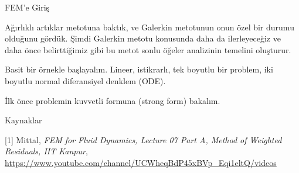 \documentclass[12pt,fleqn]{article}\usepackage{../../common}
\begin{document}
FEM'e Giriş

Ağırlıklı artıklar metotuna baktık, ve Galerkin metotunun onun özel bir durumu
olduğunu gördük. Şimdi Galerkin metotu konusunda daha da ilerleyeceğiz ve daha
önce belirttiğimiz gibi bu metot sonlu öğeler analizinin temelini oluşturur.

Basit bir örnekle başlayalım. Lineer, istikrarlı, tek boyutlu bir problem, iki
boyutlu normal diferansiyel denklem (ODE).

İlk önce problemin kuvvetli formuna (strong form) bakalım.



Kaynaklar

[1] Mittal, {\em FEM for Fluid Dynamics, Lecture 07 Part A, Method of Weighted Residuals, IIT Kanpur},
    \url{https://www.youtube.com/channel/UCWheqBdP45xBVp_Eqi1eltQ/videos}
\end{document}
